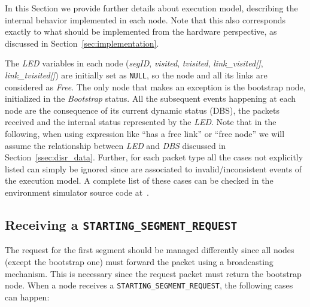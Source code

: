 In this Section we provide further details about \disr{}
execution model, describing the internal behavior implemented in
each node. Note that this also corresponds exactly to what should be
implemented from the hardware perspective, as discussed in
Section~\ref{sec:implementation}.

The \emph{LED} variables in each node
(\emph{segID}, \emph{visited}, \emph{tvisited}, \emph{link\_visited[]}, \emph{link\_tvisited[]})
are initially set as \texttt{NULL}, so the node and all its links
are considered as \emph{Free}.
The only node that makes an exception is the bootstrap node, initialized
in the \emph{Bootstrap} status. All the subsequent events happening at
each node are the consequence of its current dynamic status (DBS), the
packets received and the internal status represented by the
\emph{LED}. Note that in the following, when using expression like
``has a free link'' or ``free node'' we will assume the relationship between 
\emph{LED} and \emph{DBS} discussed in Section~\ref{ssec:disr_data}. Further, for
each packet type all the cases not explicitly listed can simply be
ignored since are associated to invalid/inconsistent events of the
\disr{} execution model. A complete list of these cases can be checked
in the environment simulator source code at~\cite{nanoxim}.

\subsection{Receiving a \texttt{STARTING\_SEGMENT\_REQUEST}}
The request for the first segment should be managed differently since
all nodes (except the bootstrap one) must forward the packet using a
broadcasting mechanism. This is necessary since the request packet must
return the bootstrap node.
When a node receives a \texttt{STARTING\_SEGMENT\_REQUEST}, the
following cases can happen:

